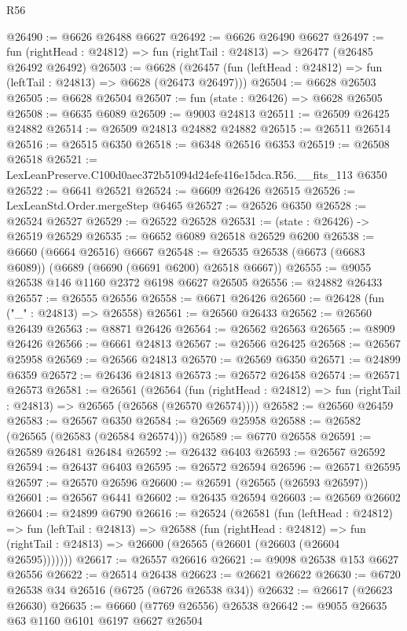\begin{lexlean}{R56}
\begin{coremodule}
@26490 := @6626 @26488 @6627
@26492 := @6626 @26490 @6627
@26497 := fun (rightHead : @24812) => fun (rightTail : @24813) => @26477 (@26485 @26492 @26492)
@26503 := @6628
    (@26457 (fun (leftHead : @24812) => fun (leftTail : @24813) => @6628 (@26473 @26497)))
@26504 := @6628 @26503
@26505 := @6628 @26504
@26507 := fun (state : @26426) => @6628 @26505
@26508 := @6635 @6089
@26509 := @9003 @24813
@26511 := @26509 @26425 @24882
@26514 := @26509 @24813 @24882 @24882
@26515 := @26511 @26514
@26516 := @26515 @6350
@26518 := @6348 @26516 @6353
@26519 := @26508 @26518
@26521 := LexLeanPreserve.C100d0aec372b51094d24efe416e15dca.R56.__fits_113 @6350
@26522 := @6641 @26521
@26524 := @6609 @26426 @26515
@26526 := LexLeanStd.Order.mergeStep @6465
@26527 := @26526 @6350
@26528 := @26524 @26527
@26529 := @26522 @26528
@26531 := (state : @26426) -> @26519 @26529
@26535 := @6652 @6089 @26518 @26529 @6200
@26538 := @6660 (@6664 @26516) @6667
@26548 := @26535 @26538 (@6673 (@6683 @6089)) (@6689 (@6690 (@6691 @6200) @26518 @6667))
@26555 := @9055 @26538 @146 @1160 @2372 @6198 @6627 @26505
@26556 := @24882 @26433
@26557 := @26555 @26556
@26558 := @6671 @26426
@26560 := @26428 (fun ("_" : @24813) => @26558)
@26561 := @26560 @26433
@26562 := @26560 @26439
@26563 := @8871 @26426
@26564 := @26562 @26563
@26565 := @8909 @26426
@26566 := @6661 @24813
@26567 := @26566 @26425
@26568 := @26567 @25958
@26569 := @26566 @24813
@26570 := @26569 @6350
@26571 := @24899 @6359
@26572 := @26436 @24813
@26573 := @26572 @26458
@26574 := @26571 @26573
@26581 := @26561
    (@26564
      (fun (rightHead : @24812) => fun (rightTail : @24813) => @26565 (@26568 (@26570 @26574))))
@26582 := @26560 @26459
@26583 := @26567 @6350
@26584 := @26569 @25958
@26588 := @26582 (@26565 (@26583 (@26584 @26574)))
@26589 := @6770 @26558
@26591 := @26589 @26481 @26484
@26592 := @26432 @6403
@26593 := @26567 @26592
@26594 := @26437 @6403
@26595 := @26572 @26594
@26596 := @26571 @26595
@26597 := @26570 @26596
@26600 := @26591 (@26565 (@26593 @26597))
@26601 := @26567 @6441
@26602 := @26435 @26594
@26603 := @26569 @26602
@26604 := @24899 @6790
@26616 := @26524
    (@26581
      (fun (leftHead : @24812) =>
      fun (leftTail : @24813) =>
      @26588
        (fun (rightHead : @24812) =>
        fun (rightTail : @24813) => @26600 (@26565 (@26601 (@26603 (@26604 @26595)))))))
@26617 := @26557 @26616
@26621 := @9098 @26538 @153 @6627 @26556
@26622 := @26514 @26438
@26623 := @26621 @26622
@26630 := @6720 @26538 @34 @26516 (@6725 (@6726 @26538 @34))
@26632 := @26617 (@26623 @26630)
@26635 := @6660 (@7769 @26556) @26538
@26642 := @9055 @26635 @63 @1160 @6101 @6197 @6627 @26504

\end{coremodule}
\end{lexlean}
